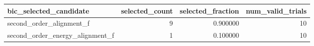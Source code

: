 \begin{tabular}{lrrr}
\toprule
bic_selected_candidate & selected_count & selected_fraction & num_valid_trials \\
\midrule
second_order_alignment_f & 9 & 0.900000 & 10 \\
second_order_energy_alignment_f & 1 & 0.100000 & 10 \\
\bottomrule
\end{tabular}
